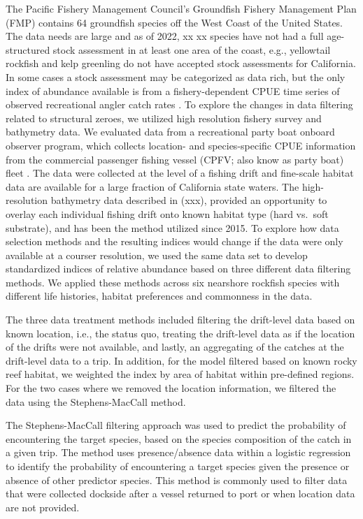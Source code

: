 \documentclass[
  authoryear,
  preprint,
  3p]{elsarticle}
\begin{document}
The Pacific Fishery Management Council's Groundfish Fishery Management
Plan (FMP) contains 64 groundfish species off the West Coast of the
United States. The data needs are large and as of 2022, xx xx species
have not had a full age-structured stock assessment in at least one area
of the coast, e.g., yellowtail rockfish and kelp greenling do not have
accepted stock assessments for California. In some cases a stock
assessment may be categorized as data rich, but the only index of
abundance available is from a fishery-dependent CPUE time series of
observed recreational angler catch rates \citep{Cope:2013:ISC}. To
explore the changes in data filtering related to structural zeroes, we
utilized high resolution fishery survey and bathymetry data. We
evaluated data from a recreational party boat onboard observer program,
which collects location- and species-specific CPUE information from the
commercial passenger fishing vessel (CPFV; also know as party boat)
fleet \citep{Monk:2014:DRD}. The data were collected at the level of a
fishing drift and fine-scale habitat data are available for a large
fraction of California state waters. The high-resolution bathymetry data
described in (xxx), provided an opportunity to overlay each individual
fishing drift onto known habitat type (hard vs.~soft substrate), and has
been the method utilized since 2015. To explore how data selection
methods and the resulting indices would change if the data were only
available at a courser resolution, we used the same data set to develop
standardized indices of relative abundance based on three different data
filtering methods. We applied these methods across six nearshore
rockfish species with different life histories, habitat preferences and
commonness in the data.

The three data treatment methods included filtering the drift-level data
based on known location, i.e., the status quo, treating the drift-level
data as if the location of the drifts were not available, and lastly, an
aggregating of the catches at the drift-level data to a trip. In
addition, for the model filtered based on known rocky reef habitat, we
weighted the index by area of habitat within pre-defined regions. For
the two cases where we removed the location information, we filtered the
data using the Stephens-MacCall method.

The Stephens-MacCall \citeyearpar{Stephens:2004:MAS} filtering approach
was used to predict the probability of encountering the target species,
based on the species composition of the catch in a given trip. The
method uses presence/absence data within a logistic regression to
identify the probability of encountering a target species given the
presence or absence of other predictor species. This method is commonly
used to filter data that were collected dockside after a vessel returned
to port or when location data are not provided.
\end{document}
